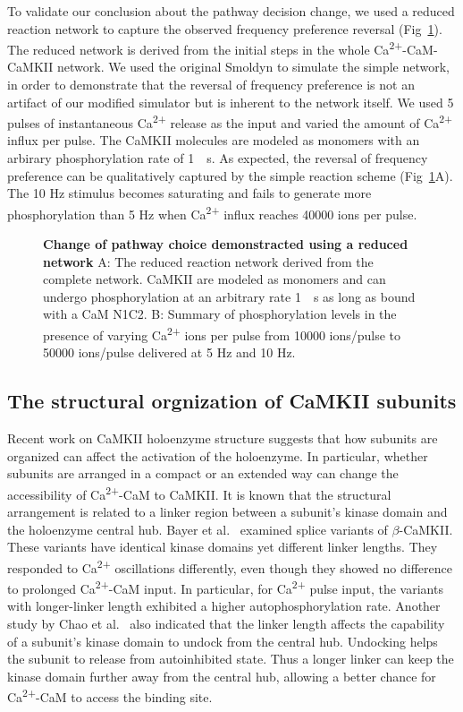 \documentclass[10pt,letterpaper]{article}
\begin{document}
To validate our conclusion about the pathway decision change, we used a reduced reaction network to capture the observed frequency preference reversal (Fig~\ref{fig12}). The reduced network is derived from the initial steps in the whole Ca\textsuperscript{2+}-CaM-CaMKII network. We used the original Smoldyn to simulate the simple network, in order to demonstrate that the reversal of frequency preference is not an artifact of our modified simulator but is inherent to the network itself. We used 5 pulses of instantaneous Ca\textsuperscript{2+} release as the input and varied the amount of Ca\textsuperscript{2+} influx per pulse. The CaMKII molecules are modeled as monomers with an arbirary phosphorylation rate of \SI{1}{\per\s}. As expected, the reversal of frequency preference can be qualitatively captured by the simple reaction scheme (Fig~\ref{fig12}A). The 10 Hz stimulus becomes saturating and fails to generate more phosphorylation than 5 Hz when Ca\textsuperscript{2+} influx reaches 40000 ions per pulse.

\begin{figure}[!h]
	\caption{{\bf Change of pathway choice demonstracted using a reduced network}
	A: The reduced reaction network derived from the complete network. CaMKII are modeled as monomers and can undergo phosphorylation at an arbitrary rate \SI{1}{\per\s} as long as bound with a CaM N1C2. 
	B: Summary of phosphorylation levels in the presence of varying Ca\textsuperscript{2+} ions per pulse from 10000 ions/pulse to 50000 ions/pulse delivered at 5 Hz and 10 Hz.
	}
\label{fig12}
\end{figure}


\subsection*{The structural orgnization of CaMKII subunits}

Recent work on CaMKII holoenzyme structure suggests that how subunits are organized can affect the activation of the holoenzyme. In particular, whether subunits are arranged in a compact or an extended way can change the accessibility of Ca\textsuperscript{2+}-CaM to CaMKII. It is known that the structural arrangement is related to a linker region between a subunit's kinase domain and the holoenzyme central hub. Bayer et al.~\cite{Bayer:2002er} examined splice variants of $\beta$-CaMKII. These variants have identical kinase domains yet different linker lengths. They responded to Ca\textsuperscript{2+} oscillations differently, even though they showed no difference to prolonged Ca\textsuperscript{2+}-CaM input. In particular, for Ca\textsuperscript{2+} pulse input, the variants with longer-linker length exhibited a higher autophosphorylation rate. Another study by Chao et al.~\cite{Chao:2011iw} also indicated that the linker length affects the capability of a subunit's kinase domain to undock from the central hub. Undocking helps the subunit to release from autoinhibited state. Thus a longer linker can keep the kinase domain further away from the central hub, allowing a better chance for Ca\textsuperscript{2+}-CaM to access the binding site.
\end{document}
